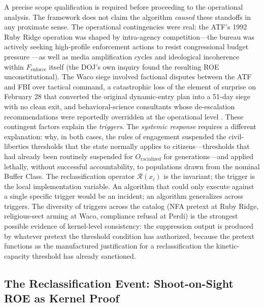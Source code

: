 A precise scope qualification is required before proceeding to the operational analysis. The framework does not claim the algorithm \textit{caused} these standoffs in any proximate sense. The operational contingencies were real: the ATF's 1992 Ruby Ridge operation was shaped by intra-agency competition---the bureau was actively seeking high-profile enforcement actions to resist congressional budget pressure \cite{dojruby1994}---as well as media amplification cycles and ideological incoherence within $F_{\text{enforce}}$ itself (the DOJ's own inquiry found the resulting ROE unconstitutional). The Waco siege involved factional disputes between the ATF and FBI over tactical command, a catastrophic loss of the element of surprise on February 28 that converted the original dynamic-entry plan into a 51-day siege with no clean exit, and behavioral-science consultants whose de-escalation recommendations were reportedly overridden at the operational level \cite{danforth2000}. These contingent factors explain the \textit{triggers}. The \textit{systemic response} requires a different explanation: why, in both cases, the rules of engagement suspended the civil-liberties thresholds that the state normally applies to citizens---thresholds that had already been routinely suspended for $O_{\text{racialized}}$ for generations---and applied lethally, without successful accountability, to populations drawn from the nominal Buffer Class. The reclassification operator $\mathcal{R}(x_i)$ is the invariant; the trigger is the local implementation variable. An algorithm that could only execute against a single specific trigger would be an incident; an algorithm generalizes across triggers. The diversity of triggers across the catalog (NFA pretext at Ruby Ridge, religious-sect arming at Waco, compliance refusal at Perdi) is the strongest possible evidence of kernel-level consistency: the suppression output is produced by whatever pretext the threshold condition has authorized, because the pretext functions as the manufactured justification for a reclassification the kinetic-capacity threshold has already sanctioned.

\subsection{The Reclassification Event: Shoot-on-Sight ROE as Kernel Proof}
\label{subsec:roe_kernel_proof}

